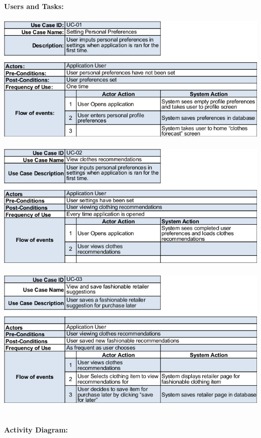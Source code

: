 \documentclass[12pt,a4paper]{article}
\begin{document}
\pagebreak

\noindent\textbf{Users and Tasks:} \\\\
\includegraphics[scale=0.7]{usecase1.png} \\\\
\includegraphics[scale=0.7]{usecase2.png} \\\\
\includegraphics[scale=0.7]{usecase3.png} \\\\

\paragraph{Activity Diagram:}
\end{document}
